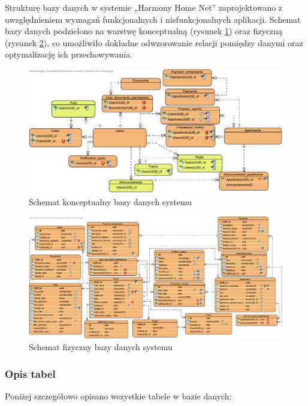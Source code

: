 Strukturę bazy danych w systemie „Harmony Home Net” zaprojektowano z uwzględnieniem wymagań funkcjonalnych i niefunkcjonalnych aplikacji. Schemat bazy danych podzielono na warstwę konceptualną (rysunek \ref{fig:ebok_db_concept}) oraz fizyczną (rysunek \ref{fig:ebok_db_physical}), co umożliwiło dokładne odwzorowanie relacji pomiędzy danymi oraz optymalizację ich przechowywania.

\begin{figure}[ht]
    \centering
    \includegraphics[width=.9\linewidth]{rys03/ebok_db_concept}
    \caption{Schemat konceptualny bazy danych systemu}
    \label{fig:ebok_db_concept}
\end{figure}

\begin{figure}[ht]
    \centering
    \includegraphics[width=1\linewidth]{rys03/ebok_db_physical}
    \caption{Schemat fizyczny bazy danych systemu}
    \label{fig:ebok_db_physical}
\end{figure}

\subsubsection{Opis tabel}

Poniżej szczegółowo opisano wszystkie tabele w bazie danych:

